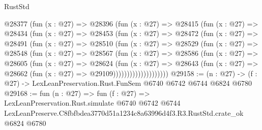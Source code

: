 \begin{lexlean}{RustStd}
\begin{coremodule}
          @28377
            (fun (x : @27) =>
            @28396
              (fun (x : @27) =>
              @28415
                (fun (x : @27) =>
                @28434
                  (fun (x : @27) =>
                  @28453
                    (fun (x : @27) =>
                    @28472
                      (fun (x : @27) =>
                      @28491
                        (fun (x : @27) =>
                        @28510
                          (fun (x : @27) =>
                          @28529
                            (fun (x : @27) =>
                            @28548
                              (fun (x : @27) =>
                              @28567
                                (fun (x : @27) =>
                                @28586
                                  (fun (x : @27) =>
                                  @28605
                                    (fun (x : @27) =>
                                    @28624
                                      (fun (x : @27) =>
                                      @28643
                                        (fun (x : @27) =>
                                        @28662 (fun (x : @27) => @29109))))))))))))))))))))
@29158 := (n : @27) -> (f : @27) -> LexLeanPreservation.Rust.FunSem @6740 @6742 @6744 @6824 @6780
@29168 := fun (n : @27) =>
  fun (f : @27) =>
  LexLeanPreservation.Rust.simulate
    @6740
    @6742
    @6744
    LexLeanPreserve.C8fbfbdea3770d51a1234c8a63996d4f3.R3.RustStd.crate_ok
    @6824
    @6780
\end{coremodule}
\end{lexlean}
